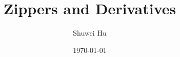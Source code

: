 \documentclass{beamer}
\title{Zippers and Derivatives}
\author{Shuwei Hu}
\date{\today}
\begin{document}
\frame{\titlepage}







\end{document}
